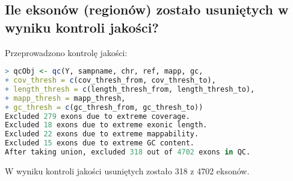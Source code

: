 \documentclass{article}
\begin{document}
\subsection{Ile eksonów (regionów) zostało usuniętych w wyniku kontroli jakości?}
Przeprowadzono kontrolę jakości:
\begin{lstlisting}[language=R]
> qcObj <- qc(Y, sampname, chr, ref, mapp, gc,
+ cov_thresh = c(cov_thresh_from, cov_thresh_to),
+ length_thresh = c(length_thresh_from, length_thresh_to),
+ mapp_thresh = mapp_thresh,
+ gc_thresh = c(gc_thresh_from, gc_thresh_to))
Excluded 279 exons due to extreme coverage.
Excluded 18 exons due to extreme exonic length.
Excluded 22 exons due to extreme mappability.
Excluded 15 exons due to extreme GC content.
After taking union, excluded 318 out of 4702 exons in QC.
\end{lstlisting}
W wyniku kontroli jakości usuniętych zostało 318 z 4702 eksonów.
\end{document}
